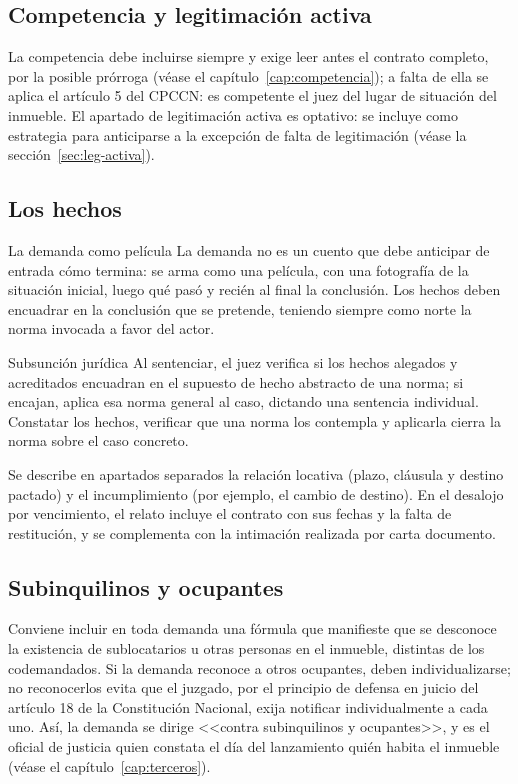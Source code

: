 \documentclass[12pt,oneside]{book}
\begin{document}
\subsection{Competencia y legitimación activa}

La competencia debe incluirse siempre y exige leer antes el contrato completo, por la posible prórroga (véase el capítulo~\ref{cap:competencia}); a falta de ella se aplica el artículo 5 del CPCCN: es competente el juez del lugar de situación del inmueble. El apartado de legitimación activa es optativo: se incluye como estrategia para anticiparse a la excepción de falta de legitimación (véase la sección~\ref{sec:leg-activa}).

\subsection{Los hechos}

\begin{example}{La demanda como película}
La demanda no es un cuento que debe anticipar de entrada cómo termina: se arma como una película, con una fotografía de la situación inicial, luego qué pasó y recién al final la conclusión. Los hechos deben encuadrar en la conclusión que se pretende, teniendo siempre como norte la norma invocada a favor del actor.
\end{example}

\begin{definition}{Subsunción jurídica}
Al sentenciar, el juez verifica si los hechos alegados y acreditados encuadran en el supuesto de hecho abstracto de una norma; si encajan, aplica esa norma general al caso, dictando una sentencia individual. Constatar los hechos, verificar que una norma los contempla y aplicarla cierra la norma sobre el caso concreto.
\end{definition}

Se describe en apartados separados la relación locativa (plazo, cláusula y destino pactado) y el incumplimiento (por ejemplo, el cambio de destino). En el desalojo por vencimiento, el relato incluye el contrato con sus fechas y la falta de restitución, y se complementa con la intimación realizada por carta documento.

\subsection{Subinquilinos y ocupantes}

Conviene incluir en toda demanda una fórmula que manifieste que se desconoce la existencia de sublocatarios u otras personas en el inmueble, distintas de los codemandados. Si la demanda reconoce a otros ocupantes, deben individualizarse; no reconocerlos evita que el juzgado, por el principio de defensa en juicio del artículo 18 de la Constitución Nacional, exija notificar individualmente a cada uno. Así, la demanda se dirige <<contra subinquilinos y ocupantes>>, y es el oficial de justicia quien constata el día del lanzamiento quién habita el inmueble (véase el capítulo~\ref{cap:terceros}).
\end{document}
